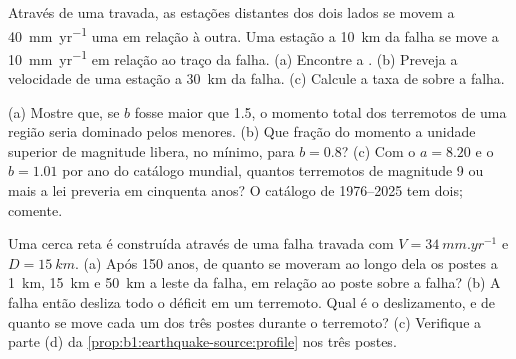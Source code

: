 \begin{exercise}[$\star\star$]\label{exo:b1:earthquake-source:9}
Através de uma  travada, as estações distantes dos dois lados se movem a \qty{40}{mm.yr^{-1}} uma em relação à outra. Uma estação a \qty{10}{km} da falha se move a \qty{10}{mm.yr^{-1}} em relação ao traço da falha. (a) Encontre a . (b) Preveja a velocidade de uma estação a \qty{30}{km} da falha. (c) Calcule a taxa de  sobre a falha.
\end{exercise}

\begin{exercise}[$\star\star\star$]\label{exo:b1:earthquake-source:10}
(a) Mostre que, se $b$ fosse maior que 1.5, o momento total dos terremotos de uma região seria dominado pelos menores. (b) Que fração do momento a unidade superior de magnitude libera, no mínimo, para $b = 0.8$? (c) Com o $a = 8.20$ e o $b = 1.01$ por ano do catálogo mundial, quantos terremotos de magnitude 9 ou mais a lei preveria em cinquenta anos? O catálogo de 1976--2025 tem dois; comente.
\end{exercise}

\begin{exercise}[$\star\star\star$]\label{exo:b1:earthquake-source:11}
Uma cerca reta é construída através de uma falha  travada com $V =
\qty{34}{mm.yr^{-1}}$ e $D = \qty{15}{km}$. (a) Após 150 anos, de quanto se moveram ao longo dela os postes a \qty{1}{km}, \qty{15}{km} e \qty{50}{km} a leste da falha, em relação ao poste sobre a falha? (b) A falha então desliza todo o déficit em um terremoto. Qual é o deslizamento, e de quanto se move cada um dos três postes durante o terremoto? (c) Verifique a parte (d) da
\cref{prop:b1:earthquake-source:profile} nos três postes.
\end{exercise}

